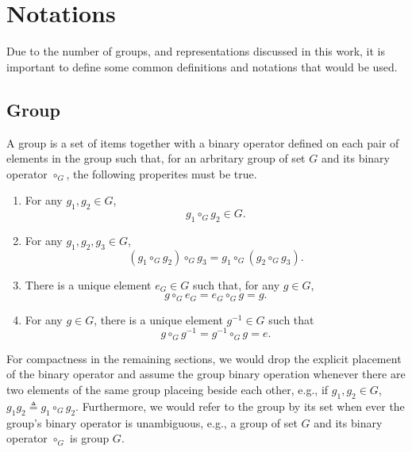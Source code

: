 \documentclass[preprint, 12pt]{revtex4-2}
\numberwithin{equation}{section}
\begin{document}
\newpage
\section{Notations}
Due to the number of groups, and representations discussed in this work, it is important to define some common definitions and notations that would be used. 

\subsection{Group}
A group is a set of items together with a binary operator defined on each pair of elements in the group such that, for an arbritary group of set $G$ and its binary operator $\circ_G$, the following properites must be true.
\begin{enumerate}
    \item For any $g_1, g_2\in G$,
        \begin{equation}\label{eq:group_closed}
            g_1\circ_G g_2\in G.
        \end{equation}
    \item For any $g_1, g_2, g_3\in G$, 
        \begin{equation}\label{eq:group_associative}
            (g_1\circ_G g_2)\circ_G g_3 = g_1\circ_G(g_2\circ_G g_3).
        \end{equation}
    \item There is a unique element $e_G\in G$ such that, for any $g\in G$,
        \begin{equation}\label{eq:group_identity}
            g\circ_G e_G=e_G\circ_G g=g.
        \end{equation}
    \item For any $g\in G$, there is a unique element $g^{-1}\in G$ such that 
        \begin{equation}\label{eq:group_inverse}
            g\circ_G g^{-1}=g^{-1}\circ_G g=e.
        \end{equation}
\end{enumerate}

For compactness in the remaining sections, we would drop the explicit placement of the binary operator and assume the group binary operation whenever there are two elements of the same group placeing beside each other, e.g., if $g_1, g_2\in G$, $g_1g_2\triangleq g_1\circ_G g_2$. Furthermore, we would refer to the group by its set when ever the group's binary operator is unambiguous, e.g., a group of set $G$ and its binary operator $\circ_G$ is group $G$.
\end{document}
